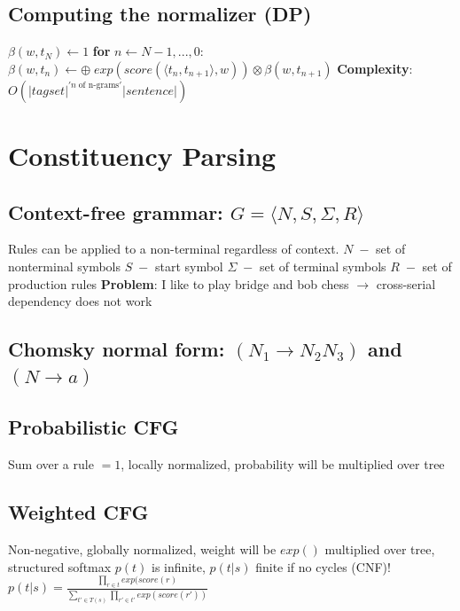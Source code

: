 \documentclass[a4paper, 11pt, landscape]{article}
\begin{document}
\begin{multicols*}{3}
\subsection{Computing the normalizer (DP)}
$\beta(w,t_N)\leftarrow 1$\newline
\textbf{for }$n\leftarrow N-1,...,0:$\newline
\phantom{for }$\beta(w,t_n)\leftarrow \oplus\; exp(score(\langle t_n,t_{n+1}\rangle,w))\otimes\beta(w,t_{n+1})$\newline
\textbf{Complexity}: $O(|tagset|^{'n\;\text{of n-grams}'}|sentence|)$

\section{Constituency Parsing}
\subsection{Context-free grammar: $G=\langle N,S,\Sigma,R\rangle$}
Rules can be applied to a non-terminal regardless of context.\newline
$N\;-$ set of nonterminal symbols\newline
$S\;-$ start symbol\newline
$\Sigma\;-$ set of terminal symbols\newline
$R\;-$ set of production rules\newline
\textbf{Problem}: I like to play bridge and bob chess $\rightarrow$ cross-serial dependency does not work

\subsection{Chomsky normal form: $(N_1\rightarrow N_2 N_3)$ and $(N\rightarrow a)$}

\subsection{Probabilistic CFG} 
Sum over a rule $= 1$, locally normalized, probability will be multiplied over tree

\subsection{Weighted CFG}
Non-negative, globally normalized, weight will be $exp()$ multiplied over tree, structured softmax\newline
$p(t)$ is infinite, $p(t|s)$ finite if no cycles (CNF)!\newline
$p(t|s)=\frac{\prod_{r\in t}exp(score(r)}{\sum_{t'\in T(s)}\prod_{r'\in t'}exp(score(r'))}$\newline


\end{multicols*}
\end{document}
